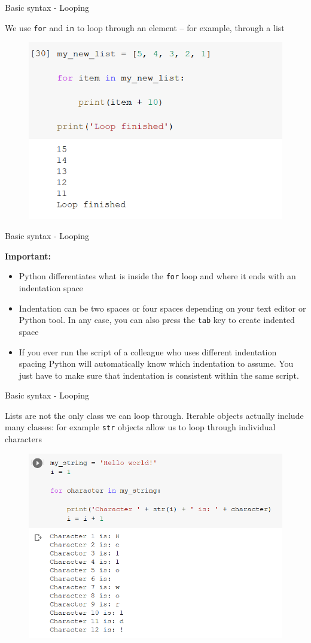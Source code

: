 \documentclass[aspectratio=169]{beamer}
\begin{document}
\begin{frame}{Basic syntax - Looping}

	We use \texttt{for} and \texttt{in} to loop through an element -- for example, through a list 

	\begin{figure}
		\centering
		\includegraphics[width=0.6\linewidth]{img/list_loop.png}
	\end{figure}

\end{frame}

\begin{frame}{Basic syntax - Looping}

	\textbf{Important:}

	\begin{itemize}	
		\item Python differentiates what is inside the \texttt{for} loop and where it ends with an indentation space
		\item Indentation can be two spaces or four spaces depending on your text editor or Python tool. In any case, you can also press the \texttt{tab} key to create indented space
		\item If you ever run the script of a colleague who uses different indentation spacing Python will automatically know which indentation to assume. You just have to make sure that indentation is consistent within the same script.
	\end{itemize}

\end{frame}

\begin{frame}{Basic syntax - Looping}

	Lists are not the only class we can loop through. Iterable objects actually include many classes: for example \texttt{str} objects allow us to loop through individual characters

	\begin{figure}
		\centering
		\includegraphics[width=0.55\linewidth]{img/string_loop.png}
	\end{figure}

\end{frame}
\end{document}
